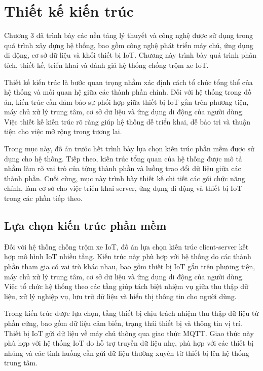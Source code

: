 \documentclass[../DoAn.tex]{subfiles}
\begin{document}
\section{Thiết kế kiến trúc}

Chương 3 đã trình bày các nền tảng lý thuyết và công nghệ được sử dụng trong quá trình xây dựng hệ thống, bao gồm công nghệ phát triển máy chủ, ứng dụng di động, cơ sở dữ liệu và khối thiết bị IoT. Chương này trình bày quá trình phân tích, thiết kế, triển khai và đánh giá hệ thống chống trộm xe IoT.

Thiết kế kiến trúc là bước quan trọng nhằm xác định cách tổ chức tổng thể của hệ thống và mối quan hệ giữa các thành phần chính. Đối với hệ thống trong đồ án, kiến trúc cần đảm bảo sự phối hợp giữa thiết bị IoT gắn trên phương tiện, máy chủ xử lý trung tâm, cơ sở dữ liệu và ứng dụng di động của người dùng. Việc thiết kế kiến trúc rõ ràng giúp hệ thống dễ triển khai, dễ bảo trì và thuận tiện cho việc mở rộng trong tương lai.

Trong mục này, đồ án trước hết trình bày lựa chọn kiến trúc phần mềm được sử dụng cho hệ thống. Tiếp theo, kiến trúc tổng quan của hệ thống được mô tả nhằm làm rõ vai trò của từng thành phần và luồng trao đổi dữ liệu giữa các thành phần. Cuối cùng, mục này trình bày thiết kế chi tiết các gói chức năng chính, làm cơ sở cho việc triển khai server, ứng dụng di động và thiết bị IoT trong các phần tiếp theo.

\subsection{Lựa chọn kiến trúc phần mềm}

Đối với hệ thống chống trộm xe IoT, đồ án lựa chọn kiến trúc client-server kết hợp mô hình IoT nhiều tầng. Kiến trúc này phù hợp với hệ thống do các thành phần tham gia có vai trò khác nhau, bao gồm thiết bị IoT gắn trên phương tiện, máy chủ xử lý trung tâm, cơ sở dữ liệu và ứng dụng di động của người dùng. Việc tổ chức hệ thống theo các tầng giúp tách biệt nhiệm vụ giữa thu thập dữ liệu, xử lý nghiệp vụ, lưu trữ dữ liệu và hiển thị thông tin cho người dùng.

Trong kiến trúc được lựa chọn, tầng thiết bị chịu trách nhiệm thu thập dữ liệu từ phần cứng, bao gồm dữ liệu cảm biến, trạng thái thiết bị và thông tin vị trí. Thiết bị IoT gửi dữ liệu về máy chủ thông qua giao thức MQTT. Giao thức này phù hợp với hệ thống IoT do hỗ trợ truyền dữ liệu nhẹ, phù hợp với các thiết bị nhúng và các tình huống cần gửi dữ liệu thường xuyên từ thiết bị lên hệ thống trung tâm.
\end{document}
